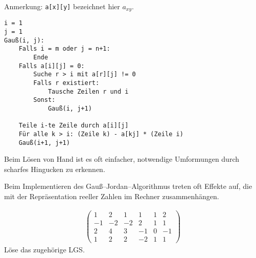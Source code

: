 Anmerkung: \texttt{a[x][y]} bezeichnet hier $a_{xy}$.
\begin{verbatim}
i = 1
j = 1
Gauß(i, j):
    Falls i = m oder j = n+1:
        Ende
    Falls a[i][j] = 0:
        Suche r > i mit a[r][j] != 0
        Falls r existiert:
            Tausche Zeilen r und i
        Sonst:
            Gauß(i, j+1)
    
    Teile i-te Zeile durch a[i][j]
    Für alle k > i: (Zeile k) - a[kj] * (Zeile i)
    Gauß(i+1, j+1)
\end{verbatim}

Beim Lösen von Hand ist es oft einfacher, notwendige Umformungen durch \glqq{}scharfes Hingucken\grqq{} zu erkennen.

Beim Implementieren des Gauß--Jordan--Algorithmus treten oft Effekte auf, die mit der Repräsentation reeller Zahlen im Rechner zusammenhängen.

\begin{align*}
    \left(\begin{array}{ccccc|c}
        1 & 2 & 1 & 1 & 1 & 2 \\
        -1 & -2 & -2 & 2 & 1 & 1 \\
        2 & 4 & 3 & -1 & 0 & -1 \\
        1 & 2 & 2 & -2 & 1 & 1
    \end{array}\right)
\end{align*}
Löse das zugehörige LGS.
